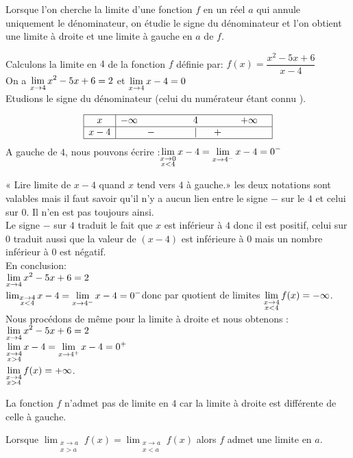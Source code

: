 Lorsque l'on cherche la limite d'une fonction $ f $ en un réel $ a $ qui annule uniquement
 le dénominateur,  on étudie le signe du dénominateur et l'on obtient une limite à droite et une limite à gauche en $ a $ de $ f $.
\begin{example}

Calculons la limite en $ 4 $ de la fonction $ f $ définie par:  \;$ f(x)=\dfrac{x^{2}-5x+6}{x-4} $\\
On a $ \displaystyle \lim_{x\to 4}x^{2}-5x+6 =2$ et $ \displaystyle \lim_{x\to 4}x-4 =0$\\
Etudions le signe du dénominateur \;(celui du numérateur étant connu ).



  \[\begin{array}{|c|ccccccc|}
\hline
x & -\infty & & 4&  &  & +\infty&\\ 
\hline
x-4    & & -~~~\qquad &|& ~~+ &  & &\\
\hline
\end{array}\]
A gauche de $ 4 $, nous pouvons écrire :$\displaystyle \lim_{\substack {x \to 0 \\ x< 4}}x-4 =\displaystyle \lim_{x\to 4^{-}}x-4 =0^{-}$

« Lire limite de $x-4$  quand $x$ tend vers $4$ à gauche.» les deux notations sont valables mais il
faut savoir qu'il n'y a aucun lien entre le signe $ - $ sur le $4$ et celui sur $0$. Il n'en est pas
toujours ainsi. \\
Le signe $ - $ sur $4$ traduit le fait que $x$ est inférieur à $4$ donc il est positif, celui
sur $0$ traduit aussi que la valeur de $(x-4)$ est inférieure à $0$ mais un nombre
inférieur à $0$ est négatif.\\En conclusion:\\ $ \displaystyle \lim_{x\to 4}x^{2}-5x+6 =2$\\$\lim_{\substack {x \to 4 \\ x< 4}}x-4 =\displaystyle \lim_{x\to 4^{-}}x-4 =0^{-}$\qquad donc  par quotient de limites  $\displaystyle \lim_{\substack {x \to 4 \\ x< 4}}f(x) =-\infty$.\\
Nous procédons de même pour la limite à droite et nous obtenons :\\
 $ \displaystyle \lim_{x\to 4}x^{2}-5x+6 =2$\\$\displaystyle \lim_{\substack {x \to 4 \\ x>  4}}x-4 =\displaystyle \lim_{x\to 4^{+}}x-4 =0^{+}$\\$\displaystyle \lim_{\substack {x \to 4 \\ x>4}}f(x) =+\infty$.
\end{example}
La fonction $  f $ n'admet pas de limite en $4$  car la limite à
droite est différente de celle à gauche.
\begin{remark}


Lorsque  $\displaystyle \lim_{\substack {x \to a \\ x>a}}f(x)= \displaystyle \lim_{\substack {x \to a \\ x< a}}f(x)$ alors $ f $ admet une limite en $ a $.
\end{remark}
 

